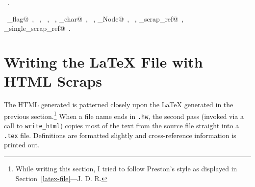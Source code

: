 \documentclass[a4paper]{report}
\begin{document}
\begin{flushleft}
\begin{list}{}{}
\mbox{}\verb@@\\
\mbox{}\verb@        fputs("\\NWlink{nuweb", tex_file);@\\
\mbox{}\verb@        write_single_scrap_ref(tex_file, defs->scrap);@\\
\mbox{}\verb@        fputs("}{", tex_file);@\\
\mbox{}\verb@        write_single_scrap_ref(tex_file, defs->scrap);@\\
\mbox{}\verb@        fputs("}", tex_file);@\\
\mbox{}\verb@@\\
\mbox{}\verb@        putc('}', tex_file);@\\
\mbox{}\verb@        page = -2;@\\
\mbox{}\verb@        defs = defs->next;@\\
\mbox{}\verb@      }@\\
\mbox{}\verb@    }@\\
\mbox{}\verb@    fputs(".\n", tex_file);@\\
\mbox{}\verb@  }@\\
\mbox{}\verb@}@{\NWsep}
\end{list}
\vspace{-1.5ex}
\footnotesize
\begin{list}{}{\setlength{\itemsep}{-\parsep}\setlength{\itemindent}{-\leftmargin}}
\item \NWtxtMacroRefIn\ .
\item \NWtxtIdentsUsed\nobreak\  \verb@dangling_flag@\nobreak\ , \verb@FALSE@\nobreak\ , \verb@fprintf@\nobreak\ , \verb@fputs@\nobreak\ , \verb@nw_char@\nobreak\ , \verb@putc@\nobreak\ , \verb@Scrap_Node@\nobreak\ , \verb@TRUE@\nobreak\ , \verb@write_scrap_ref@\nobreak\ , \verb@write_single_scrap_ref@\nobreak\ .
\item{}
\end{list}
\vspace{4ex}
\end{flushleft}
\section{Writing the LaTeX File with HTML Scraps} \label{html-file}

The HTML generated is patterned closely upon the {\LaTeX} generated in
the previous section.\footnote{\relax While writing this section, I
tried to follow Preston's style as displayed in
Section~\ref{latex-file}---J. D. R.}  When a file name ends in
\verb|.hw|, the second pass (invoked via a call to \verb|write_html|)
copies most of the text from the source file straight into a
\verb|.tex| file.  Definitions are formatted slightly and
cross-reference information is printed out.
\end{document}
